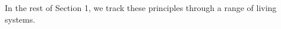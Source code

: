 \documentclass[11pt]{article}
\begin{document}
In the rest of Section 1, we track these principles through a range of living systems.















\end{document}
